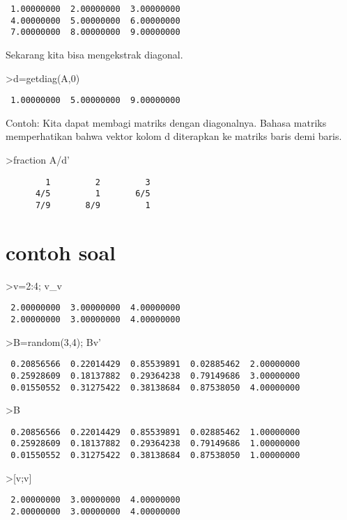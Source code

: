 \documentclass[
]{book}
\begin{document}
\begin{verbatim}
 1.00000000  2.00000000  3.00000000 
 4.00000000  5.00000000  6.00000000 
 7.00000000  8.00000000  9.00000000 
\end{verbatim}

Sekarang kita bisa mengekstrak diagonal.

\textgreater d=getdiag(A,0)

\begin{verbatim}
 1.00000000  5.00000000  9.00000000 
\end{verbatim}

Contoh: Kita dapat membagi matriks dengan diagonalnya. Bahasa matriks memperhatikan bahwa vektor kolom d diterapkan ke matriks baris demi baris.

\textgreater fraction A/d'

\begin{verbatim}
        1         2         3 
      4/5         1       6/5 
      7/9       8/9         1 
\end{verbatim}

\section{contoh soal}\label{contoh-soal-10}

\textgreater v=2:4; v\_v

\begin{verbatim}
 2.00000000  3.00000000  4.00000000 
 2.00000000  3.00000000  4.00000000 
\end{verbatim}

\textgreater B=random(3,4); B\textbar v'

\begin{verbatim}
 0.20856566  0.22014429  0.85539891  0.02885462  2.00000000 
 0.25928609  0.18137882  0.29364238  0.79149686  3.00000000 
 0.01550552  0.31275422  0.38138684  0.87538050  4.00000000 
\end{verbatim}

\textgreater B

\begin{verbatim}
 0.20856566  0.22014429  0.85539891  0.02885462  1.00000000 
 0.25928609  0.18137882  0.29364238  0.79149686  1.00000000 
 0.01550552  0.31275422  0.38138684  0.87538050  1.00000000 
\end{verbatim}

\textgreater{[}v;v{]}

\begin{verbatim}
 2.00000000  3.00000000  4.00000000 
 2.00000000  3.00000000  4.00000000 
\end{verbatim}
\end{document}
